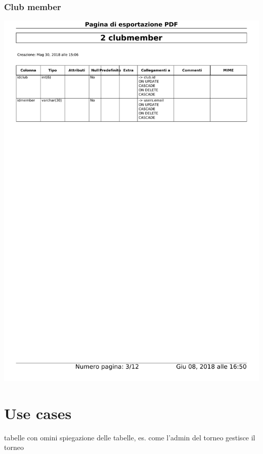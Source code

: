 \documentclass{article}
\begin{document}
    \subsubsection{Club member}
    \begin{center}
        \includegraphics[width=15cm]{images/clubmember}
    \end{center}

    \section{Use cases}
    tabelle con omini
    spiegazione delle tabelle, es. come l'admin del torneo gestisce il torneo
\end{document}
